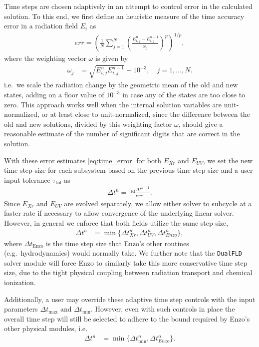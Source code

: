 \documentclass[letterpaper,10pt]{article}
\renewcommand{\(}{\left(}
\renewcommand{\)}{\right)}
\newcommand{\dt}{\Delta t}
\begin{document}
Time steps are chosen adaptively in an attempt to control error in the
calculated solution.  To this end, we first define an heuristic
measure of the time accuracy error in a radiation field $E_i$ as
\begin{align}
\label{eq:time_error}
  err = \left(\frac1N \sum_{j=1}^N
    \left(\frac{E_{i,j}^{n}-E_{i,j}^{n-1}}{\omega_j}\right)^p\right)^{1/p}, 
\end{align}
where the weighting vector $\omega$ is given by
\begin{align}
\label{eq:time_weighting}
  \omega_j &= \sqrt{E_{i,j}^n E_{i,j}^{n-1}} + 10^{-3}, \quad j=1,\ldots,N.
\end{align}
i.e.~we scale the radiation change by the geometric mean
of the old and new states, adding on a floor value of $10^{-3}$ in case any
of the states are too close to zero.  This approach works well when
the internal solution variables are unit-normalized, or at least close
to unit-normalized, since the difference between the old and new
solutions, divided by this weighting factor $\omega$, should give a
reasonable estimate of the number of significant digits that are
correct in the solution. 

With these error estimates \eqref{eq:time_error} for both $E_{Xr}$ and
$E_{UV}$, we set the new time step size for each subsystem based on
the previous time step size and a user-input tolerance $\tau_{\text{tol}}$ as
\begin{align}
\label{eq:time_estimate}
  \dt^{n} = \frac{\tau_{\text{tol}} \dt^{n-1}}{err}.
\end{align}
Since $E_{Xr}$ and $E_{UV}$ are evolved separately, we allow either
solver to subcycle at a faster rate if necessary to allow convergence
of the underlying linear solver.  However, in general we enforce that
both fields utilize the same step size,
\begin{align}
\label{eq:FLD_time_estimate}
  \dt^{n} &= \min\{\dt_{Xr}^{n},\dt_{UV}^{n},\dt_{Enzo}^{n}\},
\end{align}
where $\dt_{\text{Enzo}}$ is the time step size that Enzo's other
routines (e.g.~hydrodynamics) would normally take.  We further note
that the {\tt DualFLD} solver module will force Enzo to similarly take
this more conservative time step size, due to the tight physical
coupling between radiation transport and chemical ionization.  

Additionally, a user may override these adaptive time step controls
with the input parameters $\dt_{\text{max}}$ and $\dt_{\text{min}}$.
However, even with such controls in place the overall time step will
still be selected to adhere to the bound required by Enzo's other
physical modules, i.e.
\begin{align}
  \dt^{n} &= \min\{\dt_{\text{min}}^{n},\dt_{Enzo}^{n}\}.
\end{align}
\end{document}
